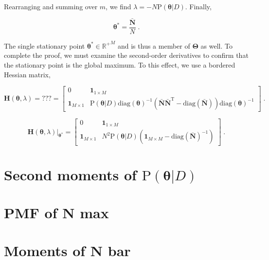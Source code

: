 \documentclass[12pt]{article}
\begin{document}
Rearranging and summing over $m$, we find $\lambda = -N \text{P}(\bm{\theta} | D)$. Finally,

\begin{equation}
\bm{\theta}^* = \frac{\bar{\bm{N}}}{N} \;.
\end{equation}

The single stationary point $\bm{\theta}^* \in {\mathbb{R}^+}^M$ and is thus a member of $\bm{\Theta}$ as well. To complete the proof, we must examine the second-order derivatives to confirm that the stationary point is the global maximum. To this effect, we use a bordered Hessian matrix,

\begin{equation}
\bm{H}(\bm{\theta},\lambda) = ??? = \begin{bmatrix} 0 & \bm{1}_{1 \times M} \\ \bm{1}_{M \times 1} & \text{P}(\bm{\theta}|D) \text{diag}(\bm{\theta})^{-1} \left( \bar{\bm{N}} \bar{\bm{N}}^{\text{T}} - \text{diag}(\bar{\bm{N}}) \right) \text{diag}(\bm{\theta})^{-1} \end{bmatrix} \;.
\end{equation}

\begin{equation}
\left. \bm{H}(\bm{\theta},\lambda) \right|_{\bm{\theta}^*} = \begin{bmatrix} 0 & \bm{1}_{1 \times M} \\ \bm{1}_{M \times 1} & N^2 \text{P}(\bm{\theta}|D) \left( \bm{1}_{M \times M} - \text{diag}(\bar{\bm{N}})^{-1} \right) \end{bmatrix} \;.
\end{equation}



\section{Second moments of $\text{P}(\bm{\theta}|D)$}





\section{PMF of N max}

\section{Moments of N bar}
\end{document}
